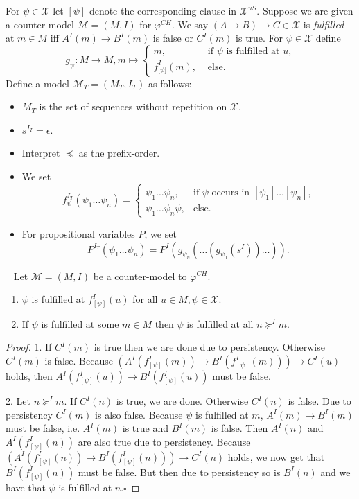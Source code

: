 \documentclass[runningheads]{llncs}
\begin{document}
\begin{definition}
For $\psi\in\mathcal X$ let $[\psi]$ denote the corresponding clause in $\mathcal X^{uS}$. Suppose we are given a counter-model $\mathcal M = (M, I)$ for $\varphi^{CH}$.
We say $(A\to B)\to C\in\mathcal X$ is \emph{fulfilled} at $m\in M$ iff $A^I(m)\to B^I(m)$ is false or $C^I(m)$ is true. For $\psi\in\mathcal X$ define $$g_\psi : M\to M, m\mapsto\begin{cases}
		m,&\text{ if $\psi$ is fulfilled at $u$,}\\
		f^I_{\lbrack\psi\rbrack}(m),&\text{ else.}		
	\end{cases}$$Define a model $\mathcal M_T = (M_T, I_T)$ as follows:
	\begin{itemize}
		\item $M_T$ is the set of sequences without repetition on $\mathcal X$.
		\item $s^{I_T} = \epsilon$.
		\item Interpret $\preceq$ as the prefix-order.
		\item We set $$f_\psi^{I_T}(\psi_1\dots\psi_n) = \begin{cases}
			\psi_1\dots\psi_n, &\text{if $\psi$ occurs in $[\psi_1]\dots[\psi_n]$,}\\
			\psi_1\dots\psi_n\psi, &\text{else.}			
		\end{cases}$$
		\item For propositional variables $P$, we set $$P^{I_T}\left(\psi_1\dots \psi_n\right) = P^I\left(g_{\psi_n}\left(\dots\left(g_{\psi_1}\left(s^I\right)\right)\dots\right)\right).$$
	\end{itemize}
\end{definition}
\begin{lemma}~\label{thm:prop-countermodel-reduction}
	Let $\mathcal M = (M, I)$ be a counter-model to $\mathcal \varphi^{CH}$.
	\begin{enumerate}
		\item $\psi$ is fulfilled at $f_{[\psi]}^I(u)$ for all $u\in M, \psi\in\mathcal X$.
		\item If $\psi$ is fulfilled at some $m\in M$ then $\psi$ is fulfilled at all $n\succeq^I m$.
	\end{enumerate}
\end{lemma}


\begin{proof}
	1. If $C^I(m)$ is true then we are done due to persistency. Otherwise $C^I(m)$ is false.
	Because $(A^I(f_{[\psi]}^I(m))\to B^I(f_{[\psi]}^I(m)))\to C^I(u)$ holds, then $A^I(f_{[\psi]}^I(u))\to B^I(f_{[\psi]}^I(u))$ must be false.
	
	
	2. Let $n\succeq^I m$.
	If $C^I(n)$ is true, we are done.
	Otherwise $C^I(n)$ is false.
	Due to persistency $C^I(m)$ is also false.
	Because $\psi$ is fulfilled at $m$, $A^I(m)\to B^I(m)$ must be false, i.e. $A^I(m)$ is true and $B^I(m)$ is false. Then $A^I(n)$ and $A^I(f^I_{[\psi]}(n))$ are also true due to persistency.
	Because $(A^I(f^I_{[\psi]}(n))\to B^I(f^I_{[\psi]}(n)))\to C^I(n)$ holds, we now get that  $B^I(f^I_{[\psi]}(n))$ must be false.
	But then due to persistency so is $B^I(n)$ and we have that $\psi$ is fulfilled at $n$.\hfill$\square$
\end{proof}
\end{document}
